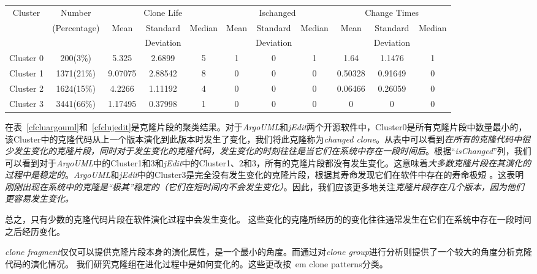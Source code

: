 \begin{table}[htbp]
\vspace{0.5em}\centering\wuhao
\begin{tabular}{ccccccccccc}
\toprule[1.5pt]
\multirow{3}{*}{Cluster}&{Number}&\multicolumn{3}{c}{Clone Life}&\multicolumn{3}{c}{Ischanged}&\multicolumn{3}{c}{Change Times} \\
&(Percentage)&\multirow{2}{*}{Mean}& Standard &\multirow{2}{*}{Median}&\multirow{2}{*}{Mean}&Standard &\multirow{2}{*}{Median}&\multirow{2}{*}{Mean}&Standard &\multirow{2}{*}{Median}\\
&&&  Deviation&&& Deviation&&& Deviation&\\ 
\midrule[1pt]
Cluster 0&	200(3\%)	&5.325	&2.6899	&5	&1	&0	&1	&1.64	&1.1476	&1\\ 
Cluster 1&	1371(21\%)	&9.07075	&2.88542	&8	&0	&0	&0	&0.50328	&0.91649	&0\\ 
Cluster 2&	1624(15\%)	&4.2266	&1.11192	&4	&0	&0	&0	&0.06466	&0.26059	&0\\ 
Cluster 3&	3441(66\%)	&1.17495	&0.37998	&1	&0	&0	&0	&0	&0	&0\\ 
\bottomrule[1.5pt]
\end{tabular}
\end{table}

在表~\ref{cfcluargouml}和~\ref{cfclujedit}是克隆片段的聚类结果。对于{\em ArgoUML}和{\em jEdit}两个开源软件中，Cluster0是所有克隆片段中数量最小的，该Cluster中的克隆代码从上一个版本演化到此版本时发生了变化，我们将此克隆称为{\em changed clone}。从表中可以看到{\em 在所有的克隆代码中很少发生变化的克隆片段，同时对于发生变化的克隆代码，发生变化的时刻往往是当它们在系统中存在一段时间后}。根据``{\em isChanged}''列，我们可以看到对于{\em  ArgoUML}中的Cluster1和3和{\em  jEdit}中的Cluster1、2和3，所有的克隆片段都没有发生变化。这意味着{\em 大多数克隆片段在其演化的过程中是稳定的}。{\em ArgoUML}和{\em jEdit}中的Cluster3是完全没有发生变化的克隆片段，根据其寿命发现它们在软件中存在的寿命极短 。这表明{\em 刚刚出现在系统中的克隆是“极其”稳定的（它们在短时间内不会发生变化）}。因此，我们应该更多地关注{\em 克隆片段存在几个版本，因为他们更容易发生变化。}

总之，只有少数的克隆代码片段在软件演化过程中会发生变化。 这些变化的克隆所经历的的变化往往通常发生在它们在系统中存在一段时间之后经历变化。


{\em clone fragment}仅仅可以提供克隆片段本身的演化属性，是一个最小的角度。而通过对{\em clone group}进行分析则提供了一个较大的角度分析克隆代码的演化情况。 %
我们研究克隆组在进化过程中是如何变化的。这些更改按{\ em clone patterns}分类。

